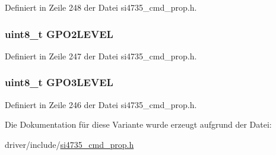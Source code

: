 Definiert in Zeile 248 der Datei si4735\+\_\+cmd\+\_\+prop.\+h.

\hypertarget{unionfm__gpio__set__arg1_a67701d7066b2ce7e0798b18633484091}{}
\subsubsection[{G\+P\+O2\+L\+E\+V\+E\+L}]{\setlength{\rightskip}{0pt plus 5cm}uint8\+\_\+t G\+P\+O2\+L\+E\+V\+E\+L}\label{unionfm__gpio__set__arg1_a67701d7066b2ce7e0798b18633484091}


Definiert in Zeile 247 der Datei si4735\+\_\+cmd\+\_\+prop.\+h.

\hypertarget{unionfm__gpio__set__arg1_af58ddf927d19d1bff07d6a0dd253d649}{}
\subsubsection[{G\+P\+O3\+L\+E\+V\+E\+L}]{\setlength{\rightskip}{0pt plus 5cm}uint8\+\_\+t G\+P\+O3\+L\+E\+V\+E\+L}\label{unionfm__gpio__set__arg1_af58ddf927d19d1bff07d6a0dd253d649}


Definiert in Zeile 246 der Datei si4735\+\_\+cmd\+\_\+prop.\+h.



Die Dokumentation für diese Variante wurde erzeugt aufgrund der Datei\+:\begin{DoxyCompactItemize}
\item 
driver/include/\hyperlink{si4735__cmd__prop_8h}{si4735\+\_\+cmd\+\_\+prop.\+h}\end{DoxyCompactItemize}
